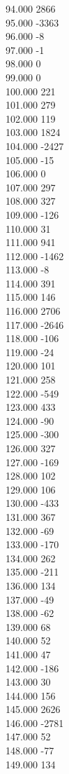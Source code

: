 { 94.000	2866 \\
 95.000	-3363 \\
 96.000	-8 \\
 97.000	-1 \\
 98.000	0 \\
 99.000	0 \\
 100.000	221 \\
 101.000	279 \\
 102.000	119 \\
 103.000	1824 \\
 104.000	-2427 \\
 105.000	-15 \\
 106.000	0 \\
 107.000	297 \\
 108.000	327 \\
 109.000	-126 \\
 110.000	31 \\
 111.000	941 \\
 112.000	-1462 \\
 113.000	-8 \\
 114.000	391 \\
 115.000	146 \\
 116.000	2706 \\
 117.000	-2646 \\
 118.000	-106 \\
 119.000	-24 \\
 120.000	101 \\
 121.000	258 \\
 122.000	-549 \\
 123.000	433 \\
 124.000	-90 \\
 125.000	-300 \\
 126.000	327 \\
 127.000	-169 \\
 128.000	102 \\
 129.000	106 \\
 130.000	-433 \\
 131.000	367 \\
 132.000	-69 \\
 133.000	-170 \\
 134.000	262 \\
 135.000	-211 \\
 136.000	134 \\
 137.000	-49 \\
 138.000	-62 \\
 139.000	68 \\
 140.000	52 \\
 141.000	47 \\
 142.000	-186 \\
 143.000	30 \\
 144.000	156 \\
 145.000	2626 \\
 146.000	-2781 \\
 147.000	52 \\
 148.000	-77 \\
 149.000	134 \\
}
